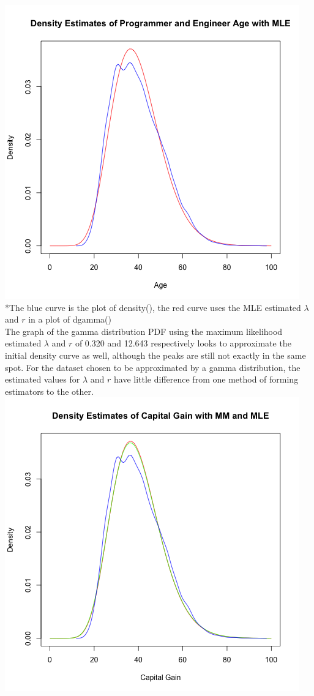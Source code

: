 \documentclass[12pt, letterpaper]{article}
\begin{document}
\includegraphics[scale=0.9]{prgeng_age_mle}
\footnotesize
\\ \**The blue curve is the plot of density(), the red curve uses the MLE estimated {$\lambda$} and $r$ in a plot of dgamma() \\
\normalsize
The graph of the gamma distribution PDF using the maximum likelihood estimated $\lambda$ and $r$ of 0.320 and 12.643 respectively looks to approximate the initial density curve as well, although the peaks are still not exactly in the same spot.
\newpage
\noindent
For the dataset chosen to be approximated by a gamma distribution, the estimated values for $\lambda$ and $r$ have little difference from one method of forming estimators to the other. \\
\includegraphics[scale=0.9]{prgeng_age_mm_mle_density}
\end{document}
